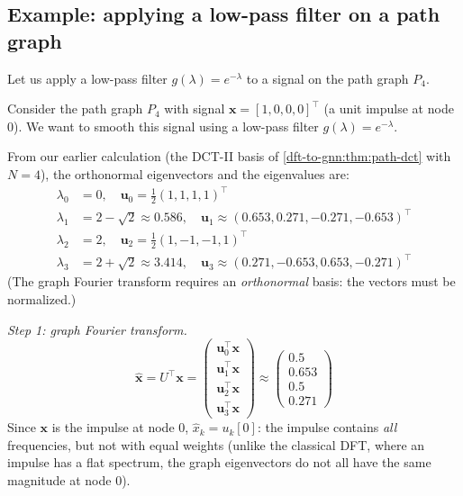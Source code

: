 \begin{notechapter}
\subsection{Example: applying a low-pass filter on a path graph}

Let us apply a low-pass filter $g(\lambda) = e^{-\lambda}$ to a signal
on the path graph $P_4$.

\begin{example}
Consider the path graph $P_4$ with signal $\mathbf{x} = [1, 0, 0, 0]^\top$
(a unit impulse at node 0). We want to smooth this signal using a
low-pass filter $g(\lambda) = e^{-\lambda}$.

From our earlier calculation (the DCT-II basis of \cref{dft-to-gnn:thm:path-dct} with $N = 4$), the
orthonormal eigenvectors and the eigenvalues are:
\begin{align*}
\lambda_0 &= 0, \quad \mathbf{u}_0 = \tfrac{1}{2}(1, 1, 1, 1)^\top \\
\lambda_1 &= 2 - \sqrt{2} \approx 0.586, \quad \mathbf{u}_1 \approx (0.653, 0.271, -0.271, -0.653)^\top \\
\lambda_2 &= 2, \quad \mathbf{u}_2 = \tfrac{1}{2}(1, -1, -1, 1)^\top \\
\lambda_3 &= 2 + \sqrt{2} \approx 3.414, \quad \mathbf{u}_3 \approx (0.271, -0.653, 0.653, -0.271)^\top
\end{align*}
(The graph Fourier transform requires an \emph{orthonormal} basis: the vectors must be normalized.)

\emph{Step 1: graph Fourier transform.}
\[
\hat{\mathbf{x}} = U^\top \mathbf{x} =
\begin{pmatrix}
\mathbf{u}_0^\top \mathbf{x} \\
\mathbf{u}_1^\top \mathbf{x} \\
\mathbf{u}_2^\top \mathbf{x} \\
\mathbf{u}_3^\top \mathbf{x}
\end{pmatrix}
\approx
\begin{pmatrix}
0.5 \\
0.653 \\
0.5 \\
0.271
\end{pmatrix}
\]
Since $\mathbf{x}$ is the impulse at node 0, $\hat{x}_k = u_k[0]$: the impulse contains \emph{all}
frequencies, but not with equal weights (unlike the classical DFT, where an impulse has a flat spectrum,
the graph eigenvectors do not all have the same magnitude at node 0).


\end{example}
\end{notechapter}
